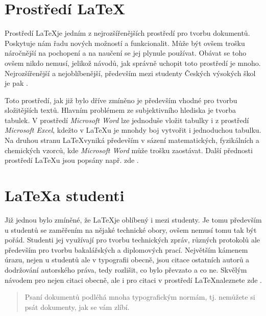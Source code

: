 \documentclass[11pt, a4paper]{article}[14.04.2023]
\begin{document}
\section{Prostředí \LaTeX}


Prostředí \LaTeX\;je jedním z nejrozšířenějších prostředí pro tvorbu dokumentů. Poskytuje nám řadu nových možností a funkcionalit.
Může být ovšem trošku náročnější na pochopení a na naučení se jej plynule používat. Obávat se toho ovšem nikdo nemusí, jelikož návodů, jak správně uchopit toto prostředí je mnoho.
Nejrozšířenější a nejoblíbenější, především mezi studenty Českých výsokých škol je pak \cite{rybicka1}.

Toto prostředí, jak již bylo dříve zmíněno je především vhodné pro tvorbu složitějších textů.
Hlavním problémem ze subjektivního hlediska je tvorba tabulek. V prostředí \textit{Microsoft Word} lze jednoduše vložit tabulky i z prostředí \textit{Microsoft Excel}, kdežto v \LaTeX{u}
\;je mnohdy boj vytvořit i jednoduchou tabulku. Na druhou stranu \LaTeX vyniká především v sázení matematických, fyzikálních a chemických vzorců, kde \textit{Microsoft Word} může trošku zaostávat.
Další přednosti prostředí \LaTeX{u} jsou popsány např. zde \cite{diplomka}.

\section{\LaTeX\;a studenti}

Již jednou bylo zmíněné, že \LaTeX\;je oblíbený i mezi studenty. Je tomu především u studentů se zaměřením na 
nějaké technické obory, ovšem nemusí tomu tak být pořád.
Studenti jej využívají pro tvorbu technických zpráv, různých protokolů ale především pro tvorbu bakalářských a diplomových prací. 
Největším kámenem úrazu, nejen u studentů ale v typografii obecně, jsou citace ostatních autorů a dodržování autorského práva, tedy rozlišit, co bylo převzato a co ne.
Skvělým návodem pro nejen citaci obecně, ale i pro citaci v prostředí \LaTeX\;naleznete zde \cite{davidekm}.
\\
\begin{quotation}
    Psaní dokumentů podléhá mnoha typografickým normám, tj. nemůžete si psát dokumenty, jak se vám zlíbí. \cite{Jirkovystranky} 
\end{quotation}

\newpage


\renewcommand{\refname}{Literatura}

\end{document}

